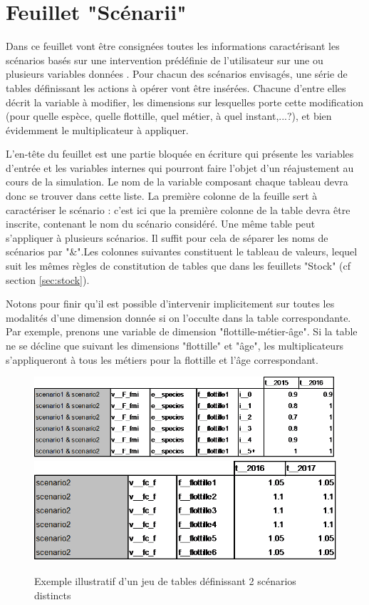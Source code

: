 \documentclass[12pt, colorinlistoftodos]{article}
\newenvironment{not used}[1]{%
    \longtable{%
        |>{\centering$\displaystyle}A{#1}{1}<{$}%
        |}\hline\ignorespaces}{%
    \endlongtable\ignorespacesafterend}
\begin{document}
\section{Feuillet "Scénarii"}

Dans ce feuillet vont être consignées toutes les informations caractérisant les scénarios basés sur une intervention prédéfinie de l'utilisateur sur une ou plusieurs variables données . Pour chacun des scénarios envisagés, une série de tables définissant les actions à opérer vont être insérées. Chacune d'entre elles décrit la variable à modifier, les dimensions sur lesquelles porte cette modification (pour quelle espèce, quelle flottille, quel métier, à quel instant,...?), et bien évidemment le multiplicateur à appliquer.

L'en-tête du feuillet est une partie bloquée en écriture qui présente les variables d'entrée et les variables internes qui pourront  faire l'objet d'un réajustement au cours de la simulation. Le nom de la variable composant chaque tableau devra donc se trouver dans cette liste. La première colonne de la feuille sert à caractériser le scénario : c'est ici que la première colonne de la table devra être inscrite, contenant le nom du scénario considéré. Une même table peut s'appliquer à plusieurs scénarios. Il suffit pour cela de séparer les noms de scénarios par "\&".Les colonnes suivantes constituent le tableau de valeurs, lequel suit les mêmes règles de constitution de tables que dans les feuillets "Stock" (cf section \ref{sec:stock}).

Notons pour finir qu'il est possible d'intervenir implicitement sur toutes les modalités d'une dimension donnée si on l'occulte dans la table correspondante. Par exemple, prenons une variable de dimension "flottille-métier-âge". Si la table ne se décline que suivant les dimensions "flottille" et "âge", les multiplicateurs s'appliqueront à tous les métiers pour la flottille et l'âge correspondant.

\begin{figure}[h!]
    \begin{center}
    \includegraphics[width = 16.3cm]{figures/param/stock12.png}
    \includegraphics[width = 13.3cm]{figures/param/stock13.png}
    \end{center}
    \caption{Exemple illustratif d'un jeu de tables définissant 2 scénarios distincts}
    \label{fig:scenar}
\end{figure}
\end{document}
